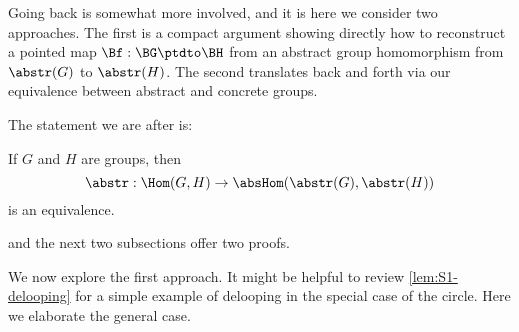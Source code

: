 Going back is somewhat more involved, and it is here we consider
two approaches. The first is a compact argument showing directly how to
reconstruct a pointed map $\Bf:\BG\ptdto\BH$ from an abstract group
homomorphism from $\abstr(G)$ to $\abstr(H)$. The second translates 
back and forth via our equivalence between abstract and concrete groups.

The statement we are after is:
\begin{lemma}
  \label{lem:homomabstrconcr}
  If $G$ and $H$ are groups, then
$$\abstr:\Hom(G,H)\to\absHom(\abstr(G),\abstr(H))$$
is an equivalence.
\end{lemma}
and the next two subsections offer two proofs.



\label{sec:delooping} %
We now explore the first approach.
It might be helpful to review \cref{lem:S1-delooping}
for a simple example of delooping in the special case of the circle.
Here we elaborate the general case.

